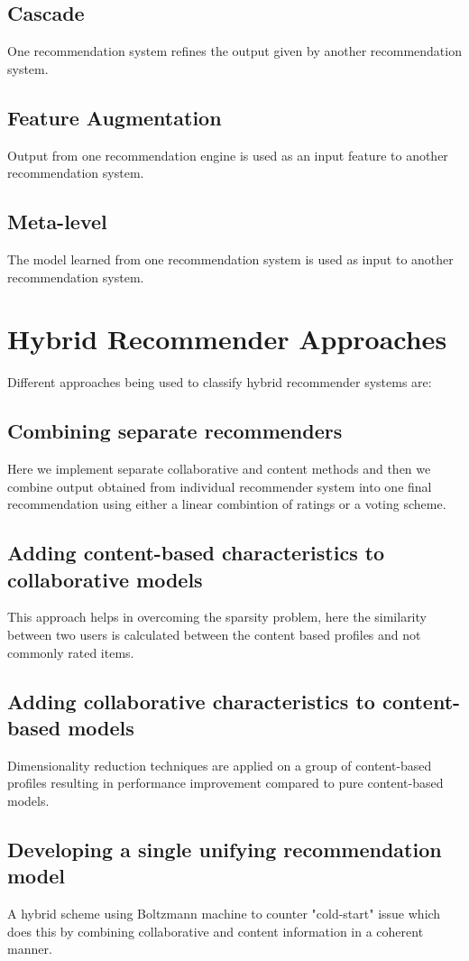\documentclass[conference]{IEEEtran}
\begin{document}
	\subsection{Cascade}
		One recommendation system refines the output given by another recommendation system.
	\subsection{Feature Augmentation}
		Output from one recommendation engine is used as an input feature to another recommendation system.
	\subsection{Meta-level}
		The model learned from one recommendation system is used as input to another recommendation system.\cite{paper3}\cite{paper4}

\section{Hybrid Recommender Approaches}

Different approaches being used to classify hybrid recommender systems are:
	\subsection{Combining separate recommenders}
		Here we implement separate collaborative and content methods and then we combine output obtained from individual recommender system into one final recommendation using either a linear combintion of ratings or a voting scheme.\cite{paper4} 
	\subsection{Adding content-based characteristics to collaborative models}
		This approach helps in overcoming the sparsity problem, here the similarity between two users is calculated between the content based profiles and not commonly rated items.
	\subsection{Adding collaborative characteristics to content-based models}
		Dimensionality reduction techniques are applied on a group of content-based profiles resulting in performance improvement  compared to pure content-based models.
	\subsection{Developing a single unifying recommendation model}
		A hybrid scheme using Boltzmann machine to counter "cold-start" issue which does this by combining collaborative and content information in a coherent manner.\cite{paper5}
	 
\end{document}

